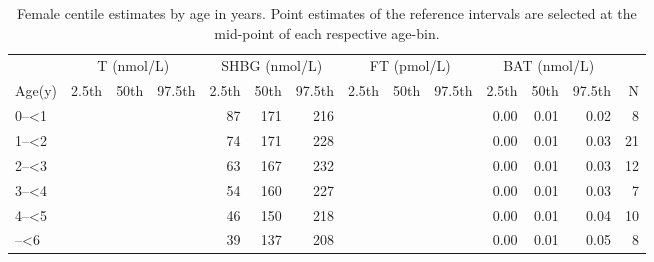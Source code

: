\documentclass[]{elsarticle} %
\begin{document}
\begin{table}[H]

\caption{\label{tab:table2}\label{tab:tab2}Female centile estimates by age in years.  Point estimates of the reference intervals are selected at the mid-point of each respective age-bin.}
\centering
\fontsize{7}{9}\selectfont
\begin{tabular}[t]{l>{}r>{}r>{}rrrr>{}r>{}r>{}rrrrr}
\toprule
\multicolumn{1}{c}{ } & \multicolumn{3}{c}{T (nmol/L)} & \multicolumn{3}{c}{SHBG (nmol/L)} & \multicolumn{3}{c}{FT (pmol/L)} & \multicolumn{3}{c}{BAT (nmol/L)} \\
\cmidrule(l{3pt}r{3pt}){2-4} \cmidrule(l{3pt}r{3pt}){5-7} \cmidrule(l{3pt}r{3pt}){8-10} \cmidrule(l{3pt}r{3pt}){11-13}
Age(y) & 2.5th & 50th & 97.5th & 2.5th & 50th & 97.5th & 2.5th & 50th & 97.5th & 2.5th & 50th & 97.5th & N\\
\midrule
0--<1 & \cellcolor[HTML]{ececec}{0.04} & \cellcolor[HTML]{ececec}{0.05} & \cellcolor[HTML]{ececec}{0.14} & 87 & 171 & 216 & \cellcolor[HTML]{ececec}{0.18} & \cellcolor[HTML]{ececec}{0.30} & \cellcolor[HTML]{ececec}{0.93} & 0.00 & 0.01 & 0.02 & 8\\
1--<2 & \cellcolor[HTML]{ececec}{0.03} & \cellcolor[HTML]{ececec}{0.05} & \cellcolor[HTML]{ececec}{0.16} & 74 & 171 & 228 & \cellcolor[HTML]{ececec}{0.15} & \cellcolor[HTML]{ececec}{0.30} & \cellcolor[HTML]{ececec}{1.11} & 0.00 & 0.01 & 0.03 & 21\\
2--<3 & \cellcolor[HTML]{ececec}{0.03} & \cellcolor[HTML]{ececec}{0.05} & \cellcolor[HTML]{ececec}{0.18} & 63 & 167 & 232 & \cellcolor[HTML]{ececec}{0.13} & \cellcolor[HTML]{ececec}{0.30} & \cellcolor[HTML]{ececec}{1.24} & 0.00 & 0.01 & 0.03 & 12\\
3--<4 & \cellcolor[HTML]{ececec}{0.03} & \cellcolor[HTML]{ececec}{0.05} & \cellcolor[HTML]{ececec}{0.19} & 54 & 160 & 227 & \cellcolor[HTML]{ececec}{0.13} & \cellcolor[HTML]{ececec}{0.31} & \cellcolor[HTML]{ececec}{1.35} & 0.00 & 0.01 & 0.03 & 7\\
4--<5 & \cellcolor[HTML]{ececec}{0.04} & \cellcolor[HTML]{ececec}{0.05} & \cellcolor[HTML]{ececec}{0.22} & 46 & 150 & 218 & \cellcolor[HTML]{ececec}{0.15} & \cellcolor[HTML]{ececec}{0.33} & \cellcolor[HTML]{ececec}{1.57} & 0.00 & 0.01 & 0.04 & 10\\
\addlinespace
5--<6 & \cellcolor[HTML]{ececec}{0.04} & \cellcolor[HTML]{ececec}{0.05} & \cellcolor[HTML]{ececec}{0.27} & 39 & 137 & 208 & \cellcolor[HTML]{ececec}{0.19} & \cellcolor[HTML]{ececec}{0.36} & \cellcolor[HTML]{ececec}{2.03} & 0.00 & 0.01 & 0.05 & 8\\

\end{tabular}
\end{table}
\end{document}
